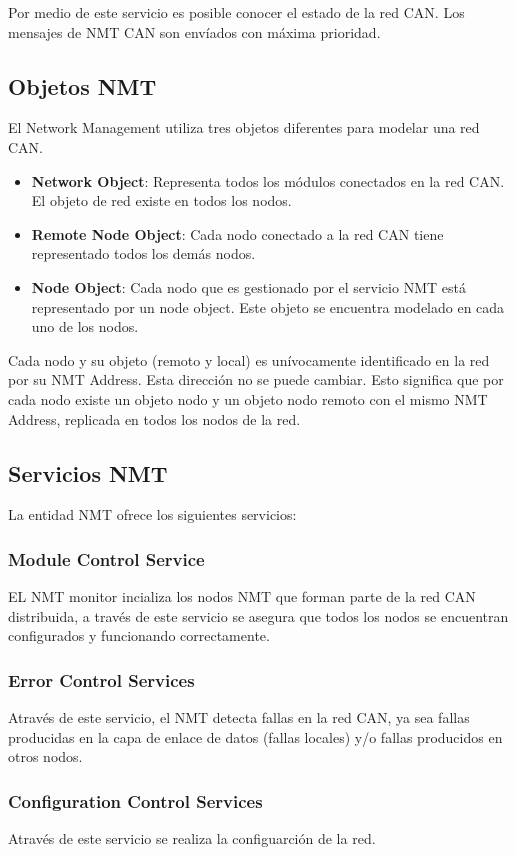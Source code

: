 Por medio de este servicio es posible conocer el estado de la red CAN. Los
mensajes de NMT CAN son envíados con máxima prioridad. 
\subsection{Objetos NMT}
El Network Management utiliza tres objetos diferentes para modelar una red CAN.
\begin{itemize}
 \item \textbf{Network Object}: Representa todos los módulos conectados en la
  red CAN. El objeto de red existe en todos los nodos.
 \item \textbf{Remote Node Object}: Cada nodo conectado a la red CAN tiene
   representado todos los demás nodos.    
 \item \textbf{Node Object}: Cada nodo que es gestionado por el servicio NMT
   está representado por un node object. Este objeto se encuentra modelado en
   cada uno de los nodos.    
 \end{itemize}
Cada nodo y su objeto (remoto y local) es unívocamente identificado en la red
por su NMT Address. Esta dirección no se puede cambiar. Esto significa que por
cada nodo existe un objeto nodo y un objeto nodo remoto con el mismo NMT
Address, replicada en todos los nodos de la red. 

\subsection{Servicios NMT}
La entidad NMT ofrece los siguientes servicios:
\subsubsection{Module Control Service}
EL NMT monitor incializa los nodos NMT que forman parte de la red CAN
distribuida, a través de este servicio se asegura que todos los nodos se
encuentran configurados y funcionando correctamente.
\subsubsection{Error Control Services}
Através de este servicio, el NMT detecta fallas en la red CAN, ya sea fallas
producidas en la capa de enlace de datos (fallas locales) y/o fallas
producidos en otros nodos.
\subsubsection{Configuration Control Services}
Através de este servicio se realiza la configuarción de la red.

